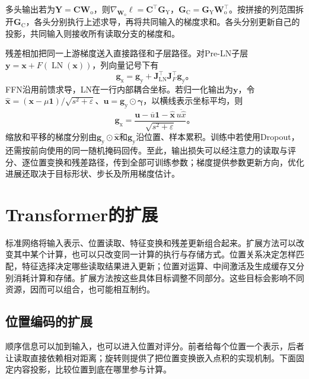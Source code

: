 多头输出若为$\bm Y=\bm C\bm W_{\mathrm o}$，则$\nabla_{\bm W_{\mathrm o}}\ell=\bm C^{\top}\bm G_{\mathrm Y}$，$\bm G_{\mathrm C}=\bm G_{\mathrm Y}\bm W_{\mathrm o}^{\top}$。按拼接的列范围拆开$\bm G_{\mathrm C}$，各头分别执行上述求导，再将共同输入的梯度求和。各头分别更新自己的投影，共同输入则接收所有读取分支的梯度和。

残差相加把同一上游梯度送入直接路径和子层路径。对Pre-LN子层$\bm y=\bm x+F(\operatorname{LN}(\bm x))$，列向量记号下有
\begin{equation}
  \bm g_{\mathrm x}=\bm g_{\mathrm y}
     +\bm J_{\operatorname{LN}}^{\top}\bm J_F^{\top}\bm g_{\mathrm y}\text{。}
  \label{eq:transformer-preln-gradient}
\end{equation}
FFN沿用前馈求导，LN在一行内部耦合坐标。若归一化输出为$\bm y$，令$\widehat{\bm x}=(\bm x-\mu\bm1)/\sqrt{s^2+\varepsilon}$、$\bm u=\bm g_{\mathrm y}\odot\bm\gamma$，以横线表示坐标平均，则
\begin{equation}
  \bm g_{\mathrm x}
   =\frac{\bm u-\overline u\bm1
             -\widehat{\bm x}\,\overline{u\widehat x}}
          {\sqrt{s^2+\varepsilon}}\text{。}
  \label{eq:transformer-layernorm-gradient}
\end{equation}
缩放和平移的梯度分别由$\bm g_{\mathrm y}\odot\widehat{\bm x}$和$\bm g_{\mathrm y}$沿位置、样本累积。训练中若使用Dropout，还需按前向使用的同一随机掩码回传。至此，输出损失可以经注意力的读取与评分、逐位置变换和残差路径，传到全部可训练参数；梯度提供参数更新方向，优化进展还取决于目标形状、步长及所用梯度估计。

\section{Transformer的扩展}
\label{sec:transformer-extensions}

标准网络将输入表示、位置读取、特征变换和残差更新组合起来。扩展方法可以改变其中某个计算，也可以只改变同一计算的执行与存储方式。位置关系决定怎样匹配，特征选择决定哪些读取结果进入更新；位置对运算、中间激活及生成缓存又分别消耗计算和存储。扩展方法按这些具体目标调整不同部分。这些目标会影响不同资源，因而可以组合，也可能相互制约。

\subsection{位置编码的扩展}
\label{sec:transformer-position-extensions}

顺序信息可以加到输入，也可以进入位置对评分。前者给每个位置一个表示，后者让读取直接依赖相对距离；旋转则提供了把位置变换嵌入点积的实现机制。下面固定内容投影，比较位置到底在哪里参与计算。

